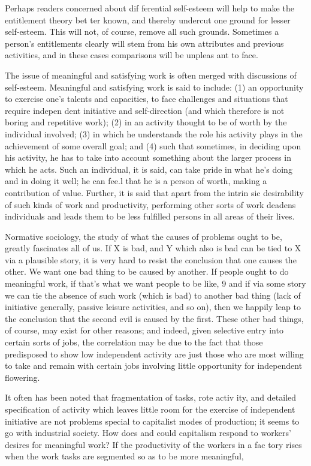 \documentclass[11pt,openany]{book}
\begin{document}
Perhaps readers concerned about dif ferential self-esteem will help to make the entitlement theory bet ter known, and thereby undercut one ground for lesser self-esteem. This will not, of course, remove all such grounds. Sometimes a person's entitlements clearly will stem from his own attributes and previous activities, and in these cases comparisons will be unpleas ant to face. 

The issue of meaningful and satisfying work is often merged with discussions of self-esteem. Meaningful and satisfying work is said to include: (1) an opportunity to exercise one's talents and capacities, to face challenges and situations that require indepen dent initiative and self-direction (and which therefore is not boring and repetitive work); (2) in an activity thought to be of worth by the individual involved; (3) in which he understands the role his activity plays in the achievement of some overall goal; and (4) such that sometimes, in deciding upon his activity, he has to take into account something about the larger process in which he acts. Such an individual, it is said, can take pride in what he's doing and in doing it well; he can fee.l that he is a person of worth, making a contribution of value. Further, it is said that apart from the intrin sic desirability of such kinds of work and productivity, performing other sorts of work deadens individuals and leads them to be less fulfilled persons in all areas of their lives. 

Normative sociology, the study of what the causes of problems ought to be, greatly fascinates all of us. If X is bad, and Y which also is bad can be tied to X via a plausible story, it is very hard to resist the conclusion that one causes the other. We want one bad thing to be caused by another. If people ought to do meaningful work, if that's what we want people to be like, 9 and if via some story we can tie the absence of such work (which is bad) to another bad thing (lack of initiative generally, passive leisure activities, and so on), then we happily leap to the conclusion that the second evil is caused by the first. These other bad things, of course, may exist for other reasons; and indeed, given selective entry into certain sorts of jobs, the correlation may be due to the fact that those predisposed to show low independent activity are just those who are most willing to take and remain with certain jobs involving little opportunity for independent flowering. 

It often has been noted that fragmentation of tasks, rote activ ity, and detailed specification of activity which leaves little room for the exercise of independent initiative are not problems special to capitalist modes of production; it seems to go with industrial society. How does and could capitalism respond to workers' desires for meaningful work? If the productivity of the workers in a fac tory rises when the work tasks are segmented so as to be more meaningful, 
\end{document}
